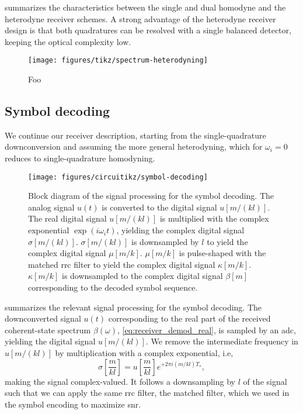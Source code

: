  summarizes the characteristics between the single and dual homodyne and the heterodyne receiver schemes.
A strong advantage of the heterodyne receiver design is that both quadratures can be resolved with a single balanced detector, keeping the optical complexity low.
\begin{figure}[htb]
	\centering
	\texttt{[image: figures/tikz/spectrum-heterodyning]}
	\caption{Foo}\label{fig:spectrum_heterodyning}
\end{figure}

\FloatBarrier
\subsection{Symbol decoding}

We continue our receiver description, starting from the single-quadrature downconversion and assuming the more general heterodyning, which for $\omega_i=0$ reduces to single-quadrature homodyning.
\begin{figure}[htb]
	\centering
	\texttt{[image: figures/circuitikz/symbol-decoding]}
	\caption{Block diagram of the signal processing for the symbol decoding. The analog signal $u(t)$ is converted to the digital signal $u[m/(kl)]$. The real digital signal $u[m/(kl)]$ is multiplied with the complex exponential $\exp(i\omega_it)$, yielding the complex digital signal $\sigma[m/(kl)]$. $\sigma[m/(kl)]$ is downsampled by $l$ to yield the complex digital signal $\mu[m/k]$. $\mu[m/k]$ is pulse-shaped with the matched \gls{rrc} filter to yield the complex digital signal $\kappa[m/k]$. $\kappa[m/k]$ is downsampled to the complex digital signal $\beta[m]$ corresponding to the decoded symbol sequence.}\label{fig:symbol_decoding_blocks}
\end{figure}
 summarizes the relevant signal processing for the symbol decoding.
The downconverted signal $u(t)$ corresponding to the real part of the received coherent-state spectrum $\beta(\omega)$, \cref{eq:receiver_demod_real}, is sampled by an \gls{adc}, yielding the digital signal $u[m/(kl)]$.
We remove the intermediate frequency in $u[m/(kl)]$ by multiplication with a complex exponential, i.e,
\begin{equation}
	\sigma\left[\frac{m}{kl}\right]
	=
	u\left[\frac{m}{kl}\right]
	e^{+2\pi i (m/kl) T_s}
	,
\end{equation}
making the signal complex-valued.
It follows a downsampling by $l$ of the signal such that we can apply the same \gls{rrc} filter, the matched filter, which we used in the symbol encoding to maximize \gls{snr}.
